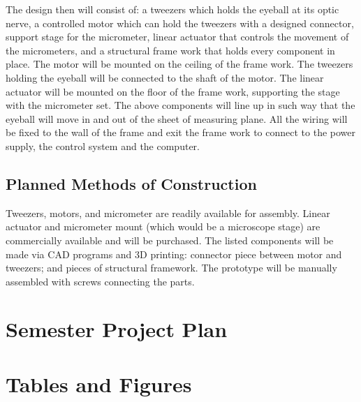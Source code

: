 \documentclass{article}
\begin{document}
The design then will consist of: a tweezers which holds the eyeball at its optic nerve, a controlled motor which can hold the tweezers with a designed connector, support stage for the micrometer, linear actuator that controls the movement of the micrometers, and a structural frame work that holds every component in place. The motor will be mounted on the ceiling of the frame work. The tweezers holding the eyeball will be connected to the shaft of the motor. The linear actuator will be mounted on the floor of the frame work, supporting the stage with the micrometer set. The above components will line up in such way that the eyeball will move in and out of the sheet of measuring plane. All the wiring will be fixed to the wall of the frame and exit the frame work to connect to the power supply, the control system and the computer.

\subsection{Planned Methods of Construction}
Tweezers, motors, and micrometer are readily available for assembly. Linear actuator and micrometer mount (which would be a microscope stage) are commercially available and will be purchased. The listed components will be made via CAD programs and 3D printing: connector piece between motor and tweezers; and pieces of structural framework. The prototype will be manually assembled with screws connecting the parts.

\section{Semester Project Plan}

\section{Tables and Figures}


\newpage


\end{document}
